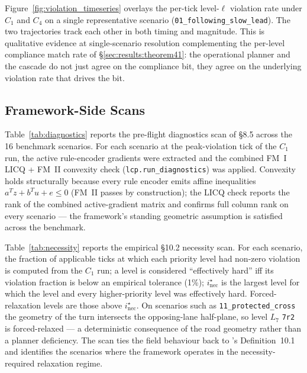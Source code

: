 Figure~\ref{fig:violation_timeseries} overlays the per-tick level-$\ell$ violation rate under $C_1$ and $C_4$ on a single representative scenario (\texttt{01\_following\_slow\_lead}). The two trajectories track each other in both timing and magnitude. This is qualitative evidence at single-scenario resolution complementing the per-level compliance match rate of \S\ref{sec:results:theorem41}: the operational planner and the cascade do not just agree on the compliance bit, they agree on the underlying violation rate that drives the bit.

\subsection{Framework-Side Scans}
\label{sec:results:framework}





Table~\ref{tab:diagnostics} reports the pre-flight diagnostics scan of \cite{lcp2025} \S8.5 across the 16 benchmark scenarios. For each scenario at the peak-violation tick of the $C_1$ run, the active rule-encoder gradients were extracted and the combined FM~I LICQ + FM~II convexity check (\texttt{lcp.run\_diagnostics}) was applied. Convexity holds structurally because every rule encoder emits affine inequalities $a^T z + b^T u + e \le 0$ (FM~II passes by construction); the LICQ check reports the rank of the combined active-gradient matrix and confirms full column rank on every scenario --- the framework's standing geometric assumption is satisfied across the benchmark.

Table~\ref{tab:necessity} reports the empirical \S10.2 necessity scan. For each scenario, the fraction of applicable ticks at which each priority level had non-zero violation is computed from the $C_1$ run; a level is considered ``effectively hard'' iff its violation fraction is below an empirical tolerance (1\%); $i^\star_{\mathrm{nec}}$ is the largest level for which the level and every higher-priority level was effectively hard. Forced-relaxation levels are those above $i^\star_{\mathrm{nec}}$. On scenarios such as \texttt{11\_protected\_cross} the geometry of the turn intersects the opposing-lane half-plane, so level $L_7$ \texttt{7r2} is forced-relaxed --- a deterministic consequence of the road geometry rather than a planner deficiency. The scan ties the field behaviour back to \cite{lcp2025}'s Definition~10.1 and identifies the scenarios where the framework operates in the necessity-required relaxation regime.

